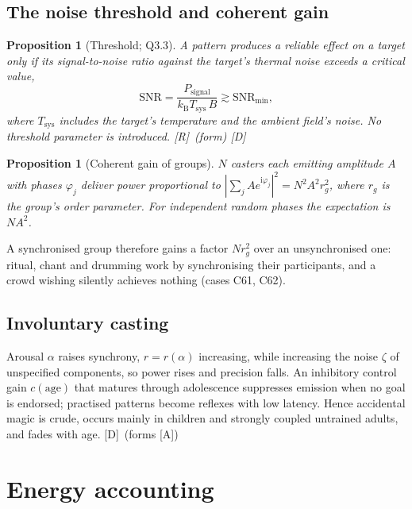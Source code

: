 \documentclass[11pt,a4paper]{article}
\numberwithin{equation}{section}
\theoremstyle{definition}
\theoremstyle{plain}
\newtheorem{proposition}[definition]{Proposition}
\theoremstyle{remark}
\newcommand{\kB}{k_{\mathrm B}}
\newcommand{\ii}{\mathrm i}
\newcommand{\abs}[1]{\left\lvert #1\right\rvert}
\newcommand{\tagD}{\textcolor{tag}{\textsf{[D]}}}
\newcommand{\tagR}{\textcolor{tag}{\textsf{[R]}}}
\newcommand{\tagA}{\textcolor{tag}{\textsf{[A]}}}
\begin{document}
\subsection{The noise threshold and coherent gain}
\begin{proposition}[Threshold; Q3.3]
A pattern produces a reliable effect on a target only if its signal-to-noise ratio against the target's thermal noise exceeds a critical value,
\begin{equation}
\mathrm{SNR}=\frac{P_{\text{signal}}}{\kB T_{\text{sys}}\,B}\gtrsim \mathrm{SNR}_{\min},
\end{equation}
where $T_{\text{sys}}$ includes the target's temperature and the ambient field's noise. No threshold parameter is introduced. \tagR\ (form) \tagD
\end{proposition}
\begin{proposition}[Coherent gain of groups]\label{prop:ritual}
$N$ casters each emitting amplitude $A$ with phases $\varphi_j$ deliver power proportional to $\abs{\sum_j Ae^{\ii\varphi_j}}^2 = N^2A^2 r_g^2$, where $r_g$ is the group's order parameter. For independent random phases the expectation is $NA^2$.
\end{proposition}
A synchronised group therefore gains a factor $N r_g^2$ over an unsynchronised one: ritual, chant and drumming work by synchronising their participants, and a crowd wishing silently achieves nothing (cases C61, C62).

\subsection{Involuntary casting}
Arousal $\alpha$ raises synchrony, $r=r(\alpha)$ increasing, while increasing the noise $\zeta$ of unspecified components, so power rises and precision falls. An inhibitory control gain $c(\text{age})$ that matures through adolescence suppresses emission when no goal is endorsed; practised patterns become reflexes with low latency. Hence accidental magic is crude, occurs mainly in children and strongly coupled untrained adults, and fades with age. \tagD\ (forms \tagA)

\section{Energy accounting}\label{sec:energy}
\end{document}
